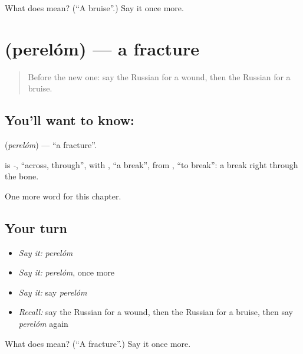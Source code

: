 \begin{tcolorbox}[breakable,colback=teal!4,colframe=teal!35!black,title={Before you move on}]
What does  mean? (\textquotedblleft{}A bruise\textquotedblright{}.) Say it once more.
\end{tcolorbox}
\section[\texorpdfstring{\ru{перелом} (perelóm)}{перелом (perelóm)}]{ (perelóm) — a fracture}

\label{lesson:RU-C179-perelom}



\begin{quote}
Before the new one: say the Russian for a wound, then the Russian for a bruise.
\end{quote}

\subsection*{You'll want to know: }
\textbf{} (\emph{perelóm}) — \textquotedblleft{}a fracture\textquotedblright{}.

\begin{cousinweb}
\textbf{} is \emph{-}, \textquotedblleft{}across, through\textquotedblright{}, with \emph{}, \textquotedblleft{}a break\textquotedblright{}, from \emph{}, \textquotedblleft{}to break\textquotedblright{}: a break right through the bone.
\end{cousinweb}

\begin{grammarlens}[title={What you've built}]
One more word for this chapter.
\end{grammarlens}

\subsection*{Your turn}
\begin{itemize}
\raggedright
  \item \emph{Say it:} \emph{perelóm}
  \item \emph{Say it:} \emph{perelóm}, once more
  \item \emph{Say it:} say \emph{perelóm}
  \item \emph{Recall:} say the Russian for a wound, then the Russian for a bruise, then say \emph{perelóm} again
\end{itemize}

\begin{tcolorbox}[breakable,colback=teal!4,colframe=teal!35!black,title={Before you move on}]
What does  mean? (\textquotedblleft{}A fracture\textquotedblright{}.) Say it once more.
\end{tcolorbox}
